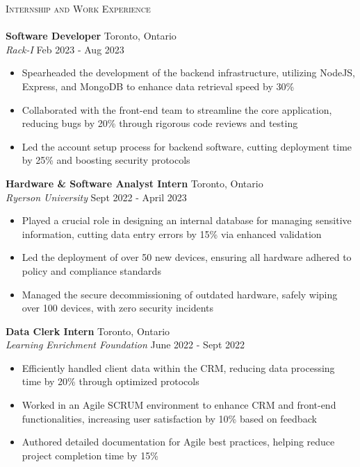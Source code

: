 \documentclass[a4paper]{article}
\newcommand{\lineunder} {
    \vspace*{-8pt} \\
    \hspace*{-18pt} \hrulefill \\
}
\newcommand{\header} [1] {
    {\hspace*{-18pt}\vspace*{6pt} \textsc{#1}}
    \vspace*{-6pt} \lineunder
}
\begin{document}
\header{Internship and Work Experience}
\textbf{Software Developer} \hfill Toronto, Ontario\\
\textit{Rack-I} \hfill Feb 2023 - Aug 2023\\
\vspace{-1mm}
\begin{itemize} \itemsep 1pt
    \item Spearheaded the development of the backend infrastructure, utilizing NodeJS, Express, and MongoDB to enhance data retrieval speed by 30\%
    \item Collaborated with the front-end team to streamline the core application, reducing bugs by 20\% through rigorous code reviews and testing
    \item Led the account setup process for backend software, cutting deployment time by 25\% and boosting security protocols
\end{itemize}
\textbf{Hardware \& Software Analyst Intern} \hfill Toronto, Ontario\\
\textit{Ryerson University} \hfill Sept 2022 - April 2023\\
\vspace{-1mm}
\begin{itemize} \itemsep 1pt
    \item Played a crucial role in designing an internal database for managing sensitive information, cutting data entry errors by 15\% via enhanced validation
    \item Led the deployment of over 50 new devices, ensuring all hardware adhered to policy and compliance standards
    \item Managed the secure decommissioning of outdated hardware, safely wiping over 100 devices, with zero security incidents
\end{itemize}
\textbf{Data Clerk Intern} \hfill Toronto, Ontario\\
\textit{Learning Enrichment Foundation} \hfill June 2022 - Sept 2022\\
\vspace{-1mm}
\begin{itemize} \itemsep 1pt
    \item Efficiently handled client data within the CRM, reducing data processing time by 20\% through optimized protocols
    \item Worked in an Agile SCRUM environment to enhance CRM and front-end functionalities, increasing user satisfaction by 10\% based on feedback
    \item Authored detailed documentation for Agile best practices, helping reduce project completion time by 15\%
\end{itemize}
\vspace{4mm}
\end{document}
